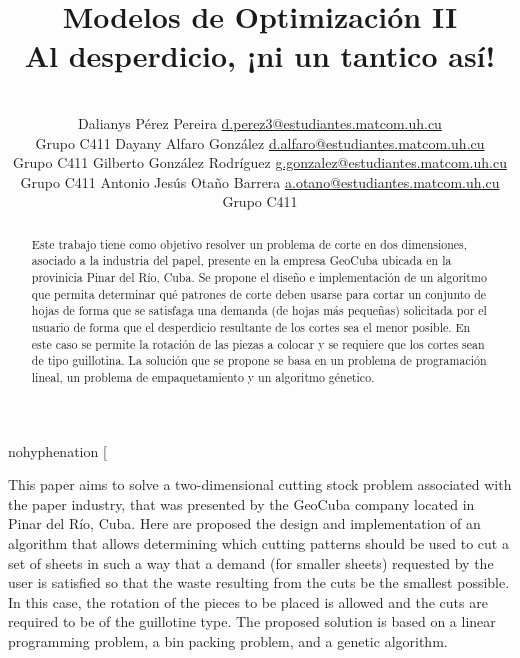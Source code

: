\documentclass[a4paper,10pt,twocolumn]{article}
\title{Modelos de Optimización II \\
	Al desperdicio, ¡ni un tantico así!}
\author{\\
\name Dalianys Pérez Pereira \email \href{mailto:d.perez3@estudiantes.matcom.uh.cu}{d.perez3@estudiantes.matcom.uh.cu}
	\\ \addr Grupo C411 \AND
\name Dayany Alfaro González \email \href{mailto:d.alfaro@estudiantes.matcom.uh.cu}{d.alfaro@estudiantes.matcom.uh.cu}
  \\ \addr Grupo C411 \AND
\name Gilberto González Rodríguez \email \href{mailto:mailto:g.gonzalez@estudiantes.matcom.uh.cu}{g.gonzalez@estudiantes.matcom.uh.cu}
\\ \addr Grupo C411 \AND
\name Antonio Jesús Otaño Barrera \email \href{mailto:a.otano@estudiantes.matcom.uh.cu}{a.otano@estudiantes.matcom.uh.cu}
\\ \addr Grupo C411}
\begin{document}
\begin{hyphenrules}{nohyphenation}
\twocolumn[

\maketitle



\begin{abstract}

Este trabajo tiene como objetivo resolver un problema de corte en dos dimensiones, asociado a la industria del papel, presente en la empresa GeoCuba ubicada en la provinicia Pinar del Río, Cuba. Se propone el  diseño e implementación de un algoritmo que permita determinar qué patrones de corte deben usarse para cortar un conjunto de hojas de forma que se satisfaga una demanda (de hojas más pequeñas) solicitada por el usuario de forma que el desperdicio resultante de los cortes sea el menor posible. En este caso se permite la rotación de las piezas a colocar y se requiere que los cortes sean de tipo guillotina. La solución que se propone se basa en un problema de programación lineal, un problema de empaquetamiento y un algoritmo génetico.

\end{abstract}

\vspace{0.5cm}

\begin{enabstract}

This paper aims to solve a two-dimensional cutting stock problem associated with the paper industry, that was presented by the GeoCuba company located in Pinar del Río, Cuba. Here are proposed the design and implementation of an algorithm that allows determining which cutting patterns should be used to cut a set of sheets in such a way that a demand (for smaller sheets) requested by the user is satisfied so that the waste resulting from the cuts be the smallest possible. In this case, the rotation of the pieces to be placed is allowed and the cuts are required to be of the guillotine type. The proposed solution is based on a linear programming problem, a bin packing problem, and a genetic algorithm. 


\end{enabstract}
\end{hyphenrules}
\end{document}
